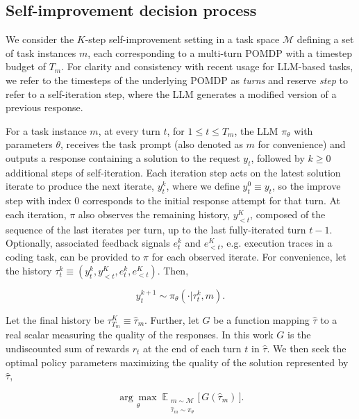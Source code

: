 \documentclass[10pt]{article} %
\begin{document}
\subsection{Self-improvement decision process}
\label{subsection:self_improvement_mdp}

We consider the $K$-step self-improvement setting in a task space $\mathcal{M}$ defining a set of task instances $m$, each corresponding to a multi-turn POMDP with a timestep budget of $T_m$. For clarity and consistency with recent usage for LLM-based tasks, we refer to the timesteps of the underlying POMDP as \emph{turns} and reserve \emph{step} to refer to a self-iteration step, where the LLM generates a modified version of a previous response.

For a task instance $m$, at every turn $t$, for $1 \le t \le T_m$, the LLM $\pi_{\theta}$ with parameters $\theta$, receives the task prompt (also denoted as $m$ for convenience) and outputs a response containing a solution to the request $y_t$, followed by $k \ge 0$ additional steps of self-iteration. Each iteration step acts on the latest solution iterate to produce the next iterate, $y_t^k$, where we define $y_t^0 \equiv y_t$, so the improve step with index $0$ corresponds to the initial response attempt for that turn. At each iteration, $\pi$ also observes the remaining history, $y^K_{<t}$, composed of the sequence of the last iterates per turn, up to the last fully-iterated turn $t-1$. Optionally, associated feedback signals $e_t^k$ and $e^K_{<t}$, e.g. execution traces in a coding task, can be provided to $\pi$ for each observed iterate. For convenience, let the history $\tau_t^k \equiv (y_t^k, y^K_{<t}, e_t^k, e^K_{<t})$. Then,

\begin{equation}
    y_t^{k+1} \sim \pi_{\theta}(\cdot | \tau_t^k, m).
\end{equation}

Let the final history be $\tau^K_{T_m} \equiv \hat{\tau}_m$. Further, let $G$ be a function mapping $\hat{\tau}$ to a real scalar measuring the quality of the responses. In this work $G$ is the undiscounted sum of rewards $r_t$ at the end of each turn $t$ in $\hat{\tau}$. We then seek the optimal policy parameters maximizing the quality of the solution represented by $\hat{\tau}$, 

\begin{equation}
\label{eq:self_improve_objective}
    \underset{\theta}{\arg \max}\;
    \mathbb{E}_{\substack{m \sim \mathcal{M}\\ \hat{\tau}_m \sim \pi_{\theta}}}
    \bigl[\,G(\hat{\tau}_m)\,\bigr].
\end{equation}
\end{document}
